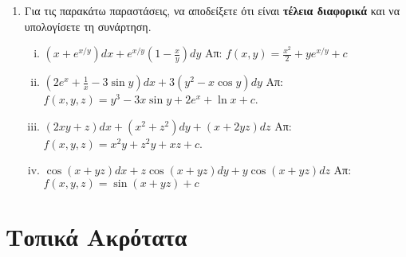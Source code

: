 \begin{enumerate}
  \item Για τις παρακάτω παραστάσεις, να αποδείξετε ότι είναι \textbf{τέλεια
    διαφορικά} και να υπολογίσετε τη συνάρτηση.
    \begin{enumerate}[i)]
      \item $ \left(x+e^{x/y}\right)dx + e^{x/y}\left(1- \frac{x}{y}\right)dy $
        \hfill Απ: $ f(x,y) = \frac{x^{2}}{2} +y e^{x/y} + c $ 

      \item $\left(2e^{x}+\frac{1}{x}-3\sin y\right)dx+3(y^2-x\cos y)dy$ 
        \hfill  Απ: $ f(x,y,z) = y^{3}-3x \sin{y} + 2e^{x} + \ln{x} +c $.

      \item $(2xy+z)dx+(x^{2}+z^{2})dy+(x+2yz)dz$ 
        \hfill  Απ: $ f(x,y,z) = x^{2}y+z^{2}y+xz +c $.


      \item $ \cos(x+yz)dx + z\cos(x+yz)dy+y\cos(x+yz)dz $
        \hfill Απ: $ f(x,y,z) = \sin(x+yz) + c $
    \end{enumerate}
\end{enumerate}


\section*{Τοπικά Ακρότατα}

